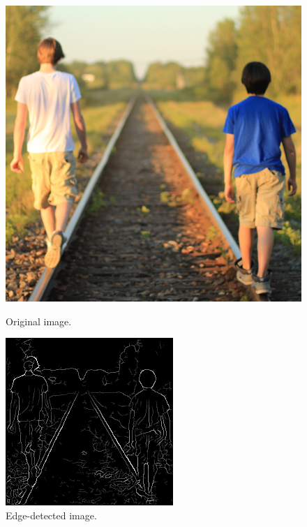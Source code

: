 \documentclass[epsfig,10pt,fullpage]{article}
\begin{document}
~\\
~\\
\begin{figure}[h]
\centering
\begin{minipage}[b]{0.475\textwidth}
	\includegraphics[width=\textwidth]{figures/tracks.png}
	\caption{Original image.}
	\label{fig:tracks}
\end{minipage}
\hfill
\begin{minipage}[b]{0.475\textwidth}
	\includegraphics[width=\textwidth]{figures/tracks_edges.png}
	\caption{Edge-detected image.}
	\label{fig:tracks_edges}
\end{minipage}
\end{figure}
\end{document}
